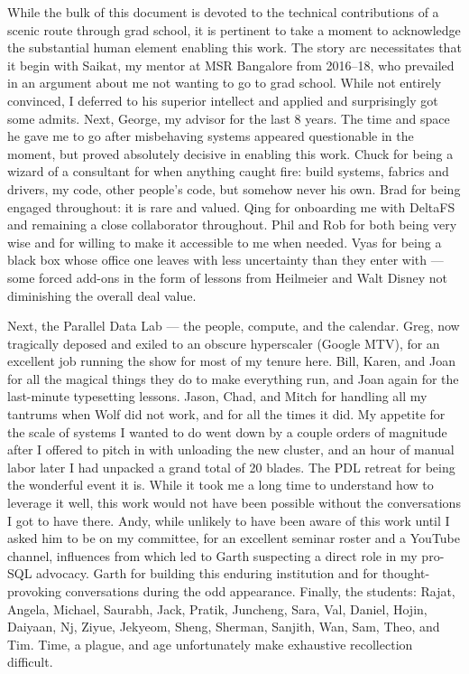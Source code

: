 \vspace{1em}

While the bulk of this
document is devoted to the technical contributions of
a scenic route through grad school, it is pertinent to take
a moment to acknowledge the substantial human element enabling this work.
The story arc necessitates that it begin with Saikat, my mentor at MSR
Bangalore from 2016--18, who prevailed in an argument about me not wanting to go to grad school.
While not entirely convinced, I deferred to his superior intellect and applied and surprisingly
got some admits.
Next, George, my advisor for the last 8 years.
The time and space he gave me to go after
misbehaving systems appeared questionable in the moment, but
proved absolutely decisive in enabling this work.
Chuck for being a wizard of a consultant for when anything caught fire: build systems,
fabrics and drivers, my code, other people's code, but somehow never his own.
Brad for being engaged throughout: it is rare and valued.
Qing for onboarding me with DeltaFS and remaining a close collaborator throughout.
Phil and Rob for both being very wise and for willing to make it accessible to me when needed.
Vyas for being a black box whose office one leaves with less uncertainty
than they enter with --- some forced add-ons in the form of lessons from Heilmeier and Walt
Disney not diminishing the overall deal value.

Next, the Parallel Data Lab --- the people, compute, and the calendar.
Greg, now tragically deposed and exiled to an obscure hyperscaler (Google MTV),
for an excellent job running the show for most of my tenure here.
Bill, Karen, and Joan for all the magical things they do to make everything run,
and Joan again for the last-minute typesetting lessons.
Jason, Chad, and Mitch for handling all my tantrums when Wolf did not work,
and for all the times it did.
My appetite for the scale of systems I wanted to do
went down by a couple orders of magnitude after I offered to pitch in with unloading
the new cluster, and an hour of manual labor later I had unpacked a grand total of 20
blades.
The PDL retreat for being the wonderful event it is.
While it took me a long time to
understand how to leverage it well,
this work would not have been possible without the conversations I got to have there.
Andy, while unlikely to have been aware of this work until I asked him to be on my committee,
for an excellent seminar roster and a YouTube channel,
influences from which led to Garth suspecting a direct role in my pro-SQL advocacy.
Garth for building this enduring institution and for thought-provoking conversations during the odd
appearance.
Finally, the students: Rajat, Angela, Michael, Saurabh, Jack, Pratik, Juncheng, Sara, Val, Daniel,
Hojin, Daiyaan, Nj, Ziyue, Jekyeom, Sheng, Sherman, Sanjith, Wan, Sam, Theo, and Tim.
Time, a plague, and age unfortunately make exhaustive recollection difficult.


